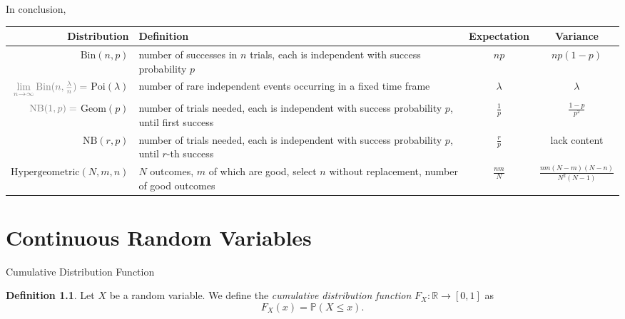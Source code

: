 \documentclass[a4paper,11pt]{amsbook}
\makeatletter
\def\section{\@startsection{section}{2}%
    \z@{1\linespacing\@plus1\linespacing}{.5\linespacing}%
    {\large\normalfont\bfseries\centering\color{darkblue}}}
\theoremstyle{definition}
\newtheorem{definition}{\hspace{-2em} \color{darkblue} Definition}[chapter]
\theoremstyle{remark}
\newcommand{\R}{\mathbb{R}}
\renewcommand{\P}{\mathbb{P}}
\newcommand\0{\varnothing}
\newcommand\Bin{\text{Bin}}
\newcommand\Poi{\text{Poi}}
\newcommand\Geom{\text{Geom}}
\makeatother
\begin{document}
    In conclusion,
    \begin{center}
        \begin{tabular}{r|m{4.7cm}cc}
            Distribution & Definition & Expectation & Variance \\ \hline
            \href{https://en.wikipedia.org/wiki/Binomial_distribution}{$\Bin(n,p)$} & number of successes in $n$ trials, each is independent with success probability $p$ & $np$ & $np(1-p)$ \\[10pt]
            ${\displaystyle\color{gray}\lim_{n\to\infty}\Bin(n,\tfrac{\lambda}{n})=\;}$\href{https://en.wikipedia.org/wiki/Poisson_distribution}{$\Poi(\lambda)$} & \rule{0pt}{3ex}number of rare independent events occurring in a fixed time frame & $\lambda$ & $\lambda$ \\[10pt]
            ${\color{gray}\text{NB}(1,p)=\;}$\href{https://en.wikipedia.org/wiki/Geometric_distribution}{$\Geom(p)$} & \rule{0pt}{3ex}number of trials needed, each is independent with success probability $p$, until first success & $\displaystyle\frac1p$ & $\displaystyle\frac{1-p}{p^2}$ \\
            \href{https://en.wikipedia.org/wiki/Negative_binomial_distribution}{$\text{NB}(r,p)$} & \rule{0pt}{3ex}number of trials needed, each is independent with success probability $p$, until $r$-th success & $\displaystyle\frac{r}{p}$ & {\color{lightgray}lack content} \\
            \href{https://en.wikipedia.org/wiki/Hypergeometric_distribution}{$\text{Hypergeometric}(N,m,n)$} & \rule{0pt}{3ex}$N$ outcomes, $m$ of which are good, select $n$ without replacement, number of good outcomes & $\displaystyle\frac{nm}{N}$ & $\displaystyle\frac{nm(N-m)(N-n)}{N^2(N-1)}$
        \end{tabular}
    \end{center}

\chapter{Continuous Random Variables}

    \section{Cumulative Distribution Function}
    
    \begin{definition}
        Let $X$ be a random variable. We define the \emph{cumulative distribution function} $F_X:\R\to[0,1]$ as
        $$F_X(x)=\P(X\leq x).$$
    \end{definition}
\end{document}
